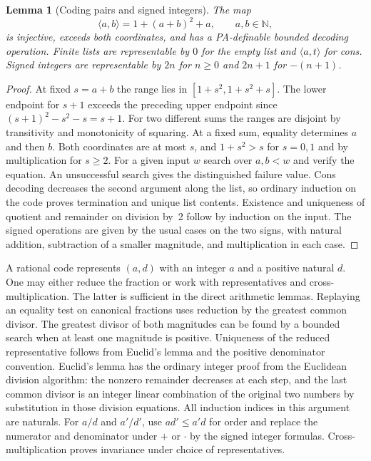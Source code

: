 \documentclass[11pt]{amsart}
\newtheorem{lemma}[theorem]{Lemma}
\theoremstyle{definition}
\theoremstyle{remark}
\numberwithin{equation}{section}
\newcommand{\N}{\mathbb N}
\newcommand{\pair}[2]{\langle #1,#2\rangle}
\begin{document}
\begin{lemma}[Coding pairs and signed integers]
The map
\[
 \pair{a}{b}=1+(a+b)^2+a,\qquad a,b\in\N,
\]
is injective, exceeds both coordinates, and has a PA-definable
bounded decoding operation. Finite lists are representable by
$0$ for the empty list and $\pair{a}{t}$ for cons. Signed integers are
representable by $2n$ for $n\ge0$ and $2n+1$ for $-(n+1)$.
\end{lemma}
\begin{proof}
At fixed $s=a+b$ the range lies in $[1+s^2,1+s^2+s]$. The lower
endpoint for $s+1$ exceeds the preceding upper endpoint since
$(s+1)^2-s^2-s=s+1$. For two different sums the ranges are
disjoint by transitivity and monotonicity of squaring. At a fixed sum,
equality determines $a$ and then $b$. Both coordinates are at most
$s$, and $1+s^2>s$ for $s=0,1$ and by multiplication for $s\ge2$.
For a given input $w$ search over $a,b<w$ and verify the equation.
An unsuccessful search gives the distinguished failure value.
Cons decoding decreases the second argument along the list, so ordinary
induction on the code proves termination and unique list contents.
Existence and uniqueness of quotient and remainder on division by~2
follow by induction on the input. The signed operations are given by
the usual cases on the two signs, with natural addition, subtraction
of a smaller magnitude, and multiplication in each case.
\end{proof}

A rational code represents $(a,d)$ with an integer $a$ and a positive
natural $d$. One may either reduce the fraction or work with
representatives and cross-multiplication. The latter is sufficient
in the direct arithmetic lemmas. Replaying an equality test on
canonical fractions uses reduction by the greatest common divisor.
The greatest divisor of both magnitudes can be found by a bounded
search when at least one magnitude is positive. Uniqueness of the
reduced representative follows from Euclid's lemma and the positive
denominator convention. Euclid's lemma has the ordinary integer proof
from the Euclidean division algorithm: the nonzero remainder decreases
at each step, and the last common divisor is an integer linear
combination of the original two numbers by substitution in those
division equations. All induction indices in this argument are naturals.
For $a/d$ and $a'/d'$, use $ad'\le a'd$ for order and replace the
numerator and denominator under $+$ or $\cdot$ by the signed integer
formulas. Cross-multiplication proves invariance under choice of
representatives.
\end{document}
